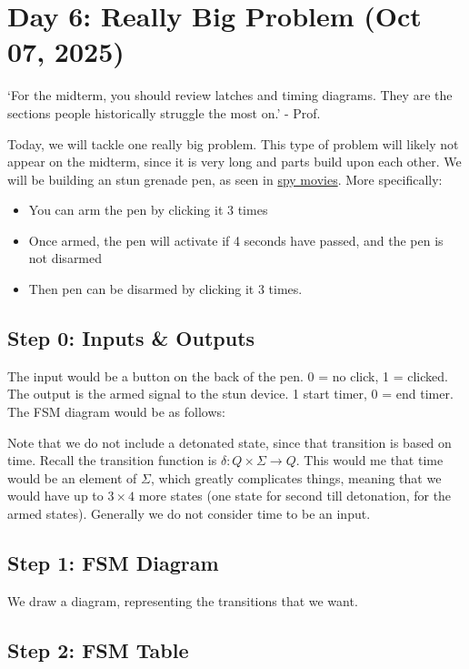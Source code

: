 \section{Day 6: Really Big Problem (Oct 07, 2025)}

\begin{remark}
`For the midterm, you should review latches and timing diagrams. They are the sections people historically struggle the most on.' - Prof.
\end{remark}

Today, we will tackle one really big problem. This type of problem will likely not appear on the midterm, since it is very long and parts build upon each other. We will be building an stun grenade pen, as seen in \href{https://www.youtube.com/watch?v=s6moLb_ieqA}{spy movies}. More specifically:
\begin{itemize}
\item You can arm the pen by clicking it 3 times
\item Once armed, the pen will activate if 4 seconds have passed, and the pen is not disarmed
\item Then pen can be disarmed by clicking it 3 times.
\end{itemize}

\subsection*{Step 0: Inputs \& Outputs}
The input would be a button on the back of the pen. 0 = no click, 1 = clicked. The output is the armed signal to the stun device. 1 start timer, 0 = end timer. The FSM diagram would be as follows:

Note that we do not include a detonated state, since that transition is based on time. Recall the transition function is $\delta: Q \times \Sigma \to Q$. This would me that time would be an element of $\Sigma$, which greatly complicates things, meaning that we would have up to $3 \times 4$ more states (one state for second till detonation, for the armed states). Generally we do not consider time to be an input.

\subsection*{Step 1: FSM Diagram}

We draw a diagram, representing the transitions that we want.

\subsection*{Step 2: FSM Table}

